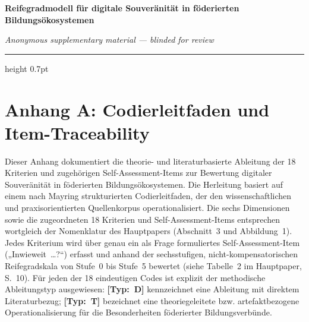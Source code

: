 \documentclass[10pt,a4paper]{article}
\begin{document}
\begin{center}
  {\Large\bfseries Reifegradmodell für digitale Souveränität in föderierten Bildungsökosystemen\par}
  \vspace{0.2em}
  {\normalsize\itshape Anonymous supplementary material --- blinded for review\par}
  \vspace{0.3em}
  \hrule height 0.7pt
\end{center}
\vspace{0.1em}

\section*{Anhang A: Codierleitfaden und Item-Traceability}
\label{sec:anhang-a}

Dieser Anhang dokumentiert die theorie- und literaturbasierte Ableitung der 18 Kriterien und zugehörigen Self-Assessment-Items zur Bewertung digitaler Souveränität in föderierten Bildungsökosystemen. Die Herleitung basiert auf einem nach Mayring \cite{Ma14} strukturierten Codierleitfaden, der den wissenschaftlichen und praxisorientierten Quellenkorpus operationalisiert. Die sechs Dimensionen sowie die zugeordneten 18 Kriterien und Self-Assessment-Items entsprechen wortgleich der Nomenklatur des Hauptpapers (Abschnitt~3 und Abbildung~1). Jedes Kriterium wird über genau ein als Frage formuliertes Self-Assessment-Item („Inwieweit~\dots?“) erfasst und anhand der sechsstufigen, nicht-kompensatorischen Reifegradskala von Stufe~0 bis Stufe~5 bewertet (siehe Tabelle~2 im Hauptpaper, S.~10). Für jeden der 18 eindeutigen Codes ist explizit der methodische Ableitungstyp ausgewiesen: \textbf{[Typ:~D]} kennzeichnet eine Ableitung mit direktem Literaturbezug; \textbf{[Typ:~T]} bezeichnet eine theoriegeleitete bzw. artefaktbezogene Operationalisierung für die Besonderheiten föderierter Bildungsverbünde.
\end{document}
